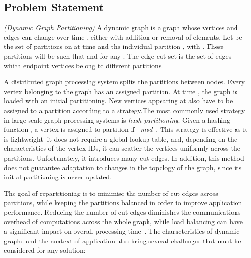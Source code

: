 \documentclass{sig-alternate-10pt}
\newenvironment{definition}[1][Definition]{\begin{trivlist}
\item[\hskip \labelsep {\bfseries #1}]}{\end{trivlist}}
\begin{document}
\subsection{Problem Statement}

\begin{definition} 

\emph{(Dynamic Graph Partitioning)}
A dynamic graph  is a graph whose vertices  and edges  can change over time , either with addition or removal of elements. Let  be the set of partitions on  at time  and   the individual partition , with . These partitions will be such that  and  for any . The edge cut set  is the set of edges which endpoint vertices belong to different partitions.
\end{definition}

A distributed graph processing system splits the partitions between nodes. Every vertex belonging to the graph has an assigned partition.  At time , the graph is loaded  with an initial partitioning.  New vertices appearing at  also have to be assigned to a partition according to a strategy.The most commonly used strategy in large-scale graph processing systems is \emph{hash partitioning}. Given a hashing function , a vertex is assigned to partition  if ~\emph{mod}~. This strategy is effective as it is lightweight, it does not require a global lookup table, and, depending on the characteristics of the vertex IDs, it can scatter the vertices uniformly across the partitions. Unfortunately, it introduces many cut edges. In addition, this method does not guarantee adaptation to changes in the topology of the graph, since its initial partitioning is never updated. 

The goal of repartitioning is to minimise the number of cut edges across partitions, while keeping the partitions balanced in order to improve application performance. Reducing the number of cut edges diminishes the communications overhead of computations across the whole graph, while load balancing can have a significant impact on overall processing time~\cite{Malewicz2009}. The characteristics of dynamic graphs and the context of application also bring several challenges that must be considered for any solution:
\end{document}
